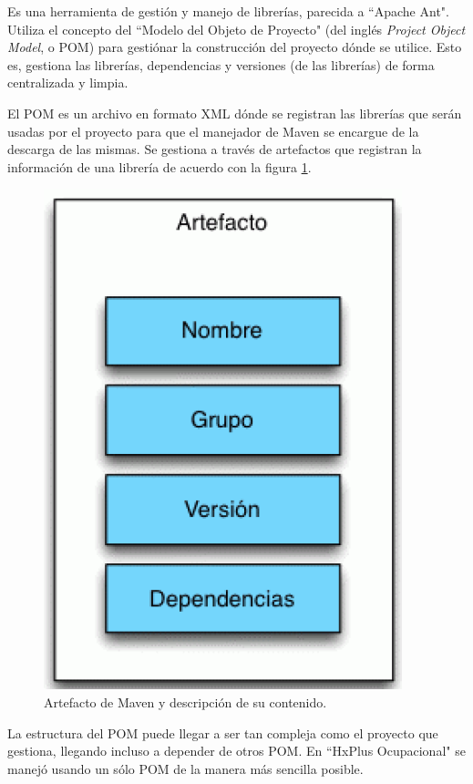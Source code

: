         Es una herramienta de gestión y manejo de librerías, parecida a ``Apache Ant". Utiliza el concepto del ``Modelo del Objeto de Proyecto" (del inglés \textit{Project Object Model}, o POM) para gestiónar la construcción del proyecto dónde se utilice. Esto es, gestiona las librerías, dependencias y versiones (de las librerías) de forma centralizada y limpia.
        
        El POM es un archivo en formato XML dónde se registran las librerías que serán usadas por el proyecto  para que el manejador de Maven se encargue de la descarga de las mismas. Se gestiona a través de artefactos que registran la información de una librería de acuerdo con la figura \ref{pom-artifact}.
        
        \begin{figure}[htbp!]
            \begin{center}
                \includegraphics[scale=0.4]{figures/pomartifact}
            \end{center}
            \caption{Artefacto de Maven y descripción de su contenido.}
            \label{pom-artifact}
        \end{figure}
        
        La estructura del POM puede llegar a ser tan compleja como el proyecto que gestiona, llegando incluso a depender de otros POM. En ``HxPlus Ocupacional" se manejó usando un sólo POM de la manera más sencilla posible.
        
